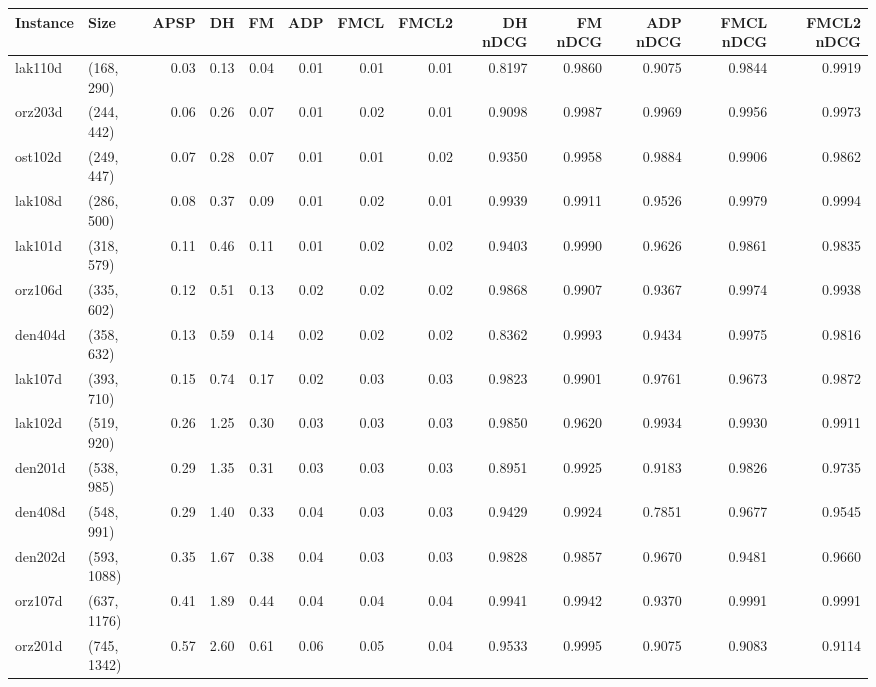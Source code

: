 \begin{tabular}{llrrrrrrrrrrr}
\toprule
Instance &         Size &  APSP &     DH &    FM &  ADP &  FMCL &  FMCL2 &  DH nDCG &  FM nDCG &  ADP nDCG &  FMCL nDCG &  FMCL2 nDCG \\
\midrule
 lak110d &   (168, 290) &  0.03 &   0.13 &  0.04 & 0.01 &  0.01 &   0.01 &   0.8197 &   0.9860 &    0.9075 &     0.9844 &      0.9919 \\
 orz203d &   (244, 442) &  0.06 &   0.26 &  0.07 & 0.01 &  0.02 &   0.01 &   0.9098 &   0.9987 &    0.9969 &     0.9956 &      0.9973 \\
 ost102d &   (249, 447) &  0.07 &   0.28 &  0.07 & 0.01 &  0.01 &   0.02 &   0.9350 &   0.9958 &    0.9884 &     0.9906 &      0.9862 \\
 lak108d &   (286, 500) &  0.08 &   0.37 &  0.09 & 0.01 &  0.02 &   0.01 &   0.9939 &   0.9911 &    0.9526 &     0.9979 &      0.9994 \\
 lak101d &   (318, 579) &  0.11 &   0.46 &  0.11 & 0.01 &  0.02 &   0.02 &   0.9403 &   0.9990 &    0.9626 &     0.9861 &      0.9835 \\
 orz106d &   (335, 602) &  0.12 &   0.51 &  0.13 & 0.02 &  0.02 &   0.02 &   0.9868 &   0.9907 &    0.9367 &     0.9974 &      0.9938 \\
 den404d &   (358, 632) &  0.13 &   0.59 &  0.14 & 0.02 &  0.02 &   0.02 &   0.8362 &   0.9993 &    0.9434 &     0.9975 &      0.9816 \\
 lak107d &   (393, 710) &  0.15 &   0.74 &  0.17 & 0.02 &  0.03 &   0.03 &   0.9823 &   0.9901 &    0.9761 &     0.9673 &      0.9872 \\
 lak102d &   (519, 920) &  0.26 &   1.25 &  0.30 & 0.03 &  0.03 &   0.03 &   0.9850 &   0.9620 &    0.9934 &     0.9930 &      0.9911 \\
 den201d &   (538, 985) &  0.29 &   1.35 &  0.31 & 0.03 &  0.03 &   0.03 &   0.8951 &   0.9925 &    0.9183 &     0.9826 &      0.9735 \\
 den408d &   (548, 991) &  0.29 &   1.40 &  0.33 & 0.04 &  0.03 &   0.03 &   0.9429 &   0.9924 &    0.7851 &     0.9677 &      0.9545 \\
 den202d &  (593, 1088) &  0.35 &   1.67 &  0.38 & 0.04 &  0.03 &   0.03 &   0.9828 &   0.9857 &    0.9670 &     0.9481 &      0.9660 \\
 orz107d &  (637, 1176) &  0.41 &   1.89 &  0.44 & 0.04 &  0.04 &   0.04 &   0.9941 &   0.9942 &    0.9370 &     0.9991 &      0.9991 \\
 orz201d &  (745, 1342) &  0.57 &   2.60 &  0.61 & 0.06 &  0.05 &   0.04 &   0.9533 &   0.9995 &    0.9075 &     0.9083 &      0.9114 \\

\end{tabular}
